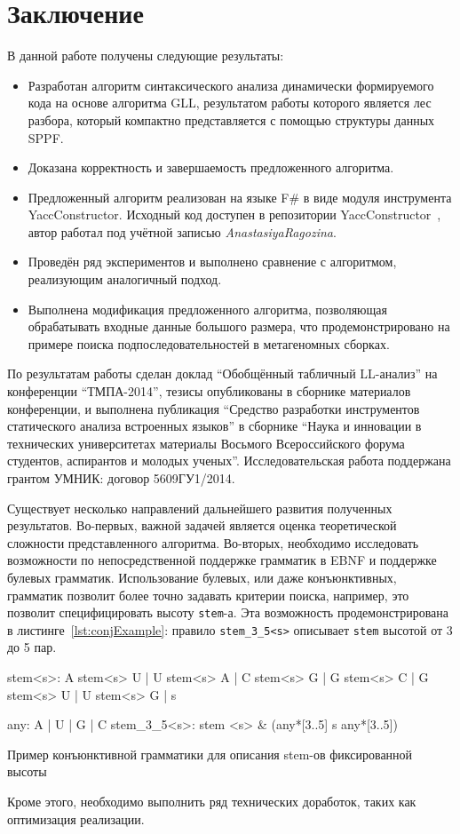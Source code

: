 \section*{Заключение}
В данной работе получены следующие результаты:
\begin{itemize}
\item Разработан алгоритм синтаксического анализа динамически  формируемого кода на основе алгоритма GLL, результатом работы которого является лес разбора, который компактно представляется с помощью структуры данных SPPF.
\item Доказана корректность и завершаемость предложенного алгоритма.
\item Предложенный алгоритм реализован на языке F\# в виде модуля инструмента YaccConstructor. Исходный код доступен в репозитории YaccConstructor~\cite{YCUrl}, автор работал под учётной записью \textit{AnastasiyaRagozina}.
\item Проведён ряд экспериментов и выполнено сравнение с алгоритмом, реализующим аналогичный подход.
\item Выполнена модификация предложенного алгоритма, позволяющая обрабатывать входные данные большого размера, что продемонстрировано на примере поиска подпоследовательностей в метагеномных сборках.
\end{itemize}

По результатам работы сделан доклад ``Обобщённый табличный LL-анализ'' на конференции ``ТМПА-2014'', тезисы опубликованы в сборнике материалов конференции,  и выполнена  публикация ``Средство разработки инструментов статического анализа встроенных языков'' в сборнике ``Наука и инновации в технических университетах материалы Восьмого Всероссийского форума студентов, аспирантов и молодых ученых''. Исследовательская работа поддержана грантом УМНИК: договор \textnumero 5609ГУ1/2014.

Существует несколько направлений дальнейшего развития полученных результатов. Во-первых, важной задачей является оценка теоретической сложности представленного алгоритма. Во-вторых, необходимо исследовать возможности по непосредственной поддержке грамматик в EBNF и поддержке булевых грамматик. Использование булевых, или даже конъюнктивных, грамматик позволит более точно задавать критерии поиска, например, это позволит специфицировать высоту \texttt{stem}-а. Эта возможность продемонстрирована в листинге~\ref{lst:conjExample}: правило \verb|stem_3_5<s>| описывает \texttt{stem} высотой от 3 до 5 пар.

\begin{listing}
    \begin{pyglist}[language=ocaml,numbers=left,numbersep=5pt]

stem<s>: 
      A stem<s> U
    | U stem<s> A
    | C stem<s> G
    | G stem<s> C
    | G stem<s> U
    | U stem<s> G
    | s

any: A | U | G | C
stem_3_5<s>: stem <s> & (any*[3..5] s any*[3..5])

\end{pyglist}
\caption{Пример конъюнктивной грамматики для описания stem-ов фиксированной высоты}
\label{lst:conjExample}
\end{listing}


Кроме этого, необходимо выполнить ряд технических доработок, таких как оптимизация реализации.
